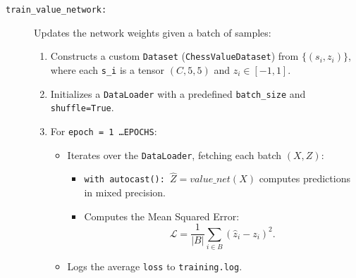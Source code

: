 \documentclass{report}
\begin{document}
\begin{itemize}
\begin{description}
      \item[\texttt{train\_value\_network:}]  
        Updates the network weights given a batch of samples:
        \begin{enumerate}
          \item Constructs a custom \texttt{Dataset} (\texttt{ChessValueDataset}) from \(\{(s_i, z_i)\}\), where each \texttt{s\_i} is a tensor \((C,5,5)\) and \(z_i \in [-1,1]\).
          \item Initializes a \texttt{DataLoader} with a predefined \texttt{batch\_size} and \texttt{shuffle=True}.
          \item For \texttt{epoch = 1 \dots EPOCHS}:
            \begin{itemize}
              \item Iterates over the \texttt{DataLoader}, fetching each batch \((X, Z)\):
                \begin{itemize}
                  \item \texttt{with autocast(): \(\hat{Z} = value\_net(X)\)} computes predictions in mixed precision.
                  \item Computes the Mean Squared Error:
                    \[
                      \mathcal{L} = \frac{1}{|B|} \sum_{i \in B} (\hat{z}_i - z_i)^2.
                    \]
                \end{itemize}
              \item Logs the average \texttt{loss} to \texttt{training.log}.
            \end{itemize}
        \end{enumerate}


\end{description}
\end{itemize}
\end{document}

